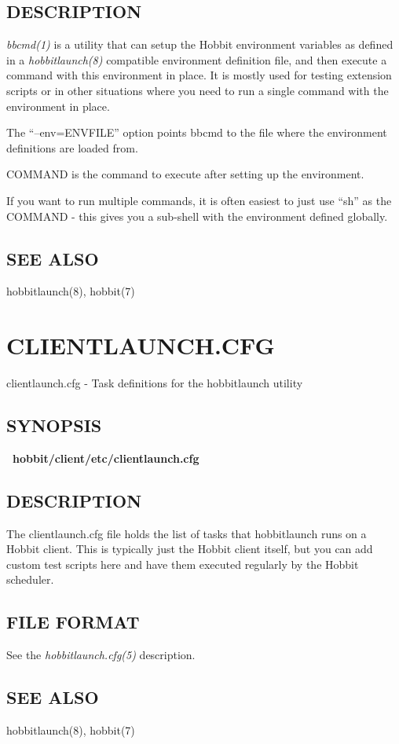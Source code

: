  
\subsection{DESCRIPTION}
\emph{bbcmd(1)} is a utility that can setup the Hobbit environment
variables as defined in a \emph{hobbitlaunch(8)} compatible
environment definition file, and then execute a command with this
environment in place. It is mostly used for testing extension scripts
or in other situations where you need to run a single command with the
environment in place. 


The ``--env=ENVFILE'' option points bbcmd to the file where the
environment definitions are loaded from. 



COMMAND is the command to execute after setting up the environment. 

If you want to run multiple commands, it is often easiest to just use
``sh'' as the COMMAND - this gives you a sub-shell with the
environment defined globally. 

\subsection{SEE ALSO} hobbitlaunch(8), hobbit(7) 



%
\newpage
\section{CLIENTLAUNCH.CFG}
 clientlaunch.cfg - Task definitions for the hobbitlaunch utility 

 
\subsection{SYNOPSIS}
\textbf{~hobbit/client/etc/clientlaunch.cfg}


 
\subsection{DESCRIPTION}
 The clientlaunch.cfg file holds the list of tasks that hobbitlaunch
 runs on a Hobbit client. This is typically just the Hobbit client
 itself, but you can add custom test scripts here and have them
 executed regularly by the Hobbit scheduler. 


 
\subsection{FILE FORMAT}
 See the \emph{hobbitlaunch.cfg(5)}
 description. 

 
\subsection{SEE ALSO}
hobbitlaunch(8), hobbit(7) 


